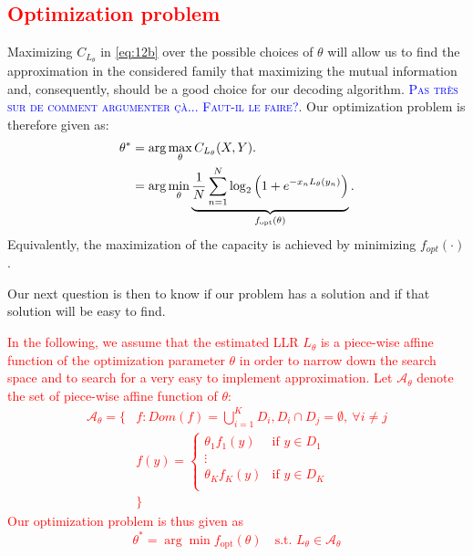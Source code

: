 \documentclass[a4paper]{IEEEtran}
\begin{document}
\subsection{\textcolor{red}{Optimization problem}}
\label{subsection:OptimPb}

Maximizing $C_{L_\theta}$ in \eqref{eq:12b} over the
possible choices of $\theta$ will allow us to find the
approximation in the considered family that maximizing the
mutual information and, consequently, should be a good
choice for our decoding algorithm.
\textcolor{blue}{\textsc{Pas très sur de comment argumenter
    çà... Faut-il le faire?}}. Our optimization problem is
therefore given as:
\begin{equation}
  \label{eq:15}
  \begin{aligned}
    \theta^*
    &= \arg\max_\theta C_{L_\theta}(X,Y).\\
    &= \arg\min_\theta
    \underbrace{\frac1N\sum_{n=1}^N\log_2\left(1+e^{-x_nL_\theta(y_n)}\right)}_{%
      f_{\text{opt}}(\theta)}.
  \end{aligned}
\end{equation}
Equivalently, the maximization of the capacity is achieved
by minimizing $f_{opt}(\cdot)$.

Our next question is then to know if our problem has
a solution and if that solution will be easy to find.

\textcolor{red}{In the following, we assume that the
  estimated LLR $L_\theta$ is a piece-wise affine function
  of the optimization parameter $\theta$ in order to narrow
  down the search space and to search for a very easy to
  implement approximation. Let $\mathcal{A}_\theta$ denote
  the set of piece-wise affine function of $\theta$: 
  \begin{align}
    \mathcal A_\theta=\{&f:Dom(f)=\bigcup_{i=1}^K D_i, D_i\cap D_j=\emptyset, \ \forall i\neq j\\
    &f(y)=\begin{cases}
      \theta_1 f_1(y) &\text{if $y\in D_1$}\\
      \vdots\\
      \theta_K f_K(y) &\text{if $y\in D_K$}\\
    \end{cases}\\
    &\}
  \end{align}
  Our optimization problem is thus given as 
  \begin{equation*}
    \theta^*=\arg \min f_{\text{opt}}(\theta)
    \quad\text{s.t. } L_\theta \in \mathcal A_\theta
  \end{equation*}
}
\end{document}
